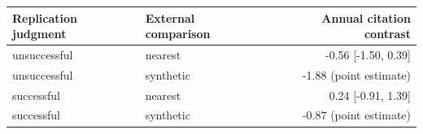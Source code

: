\begin{tabular}{llr}
\toprule
Replication judgment & External comparison & Annual citation contrast \\
\midrule
unsuccessful & nearest & -0.56 [-1.50, 0.39] \\
unsuccessful & synthetic & -1.88 (point estimate) \\
successful & nearest & 0.24 [-0.91, 1.39] \\
successful & synthetic & -0.87 (point estimate) \\
\bottomrule
\end{tabular}
